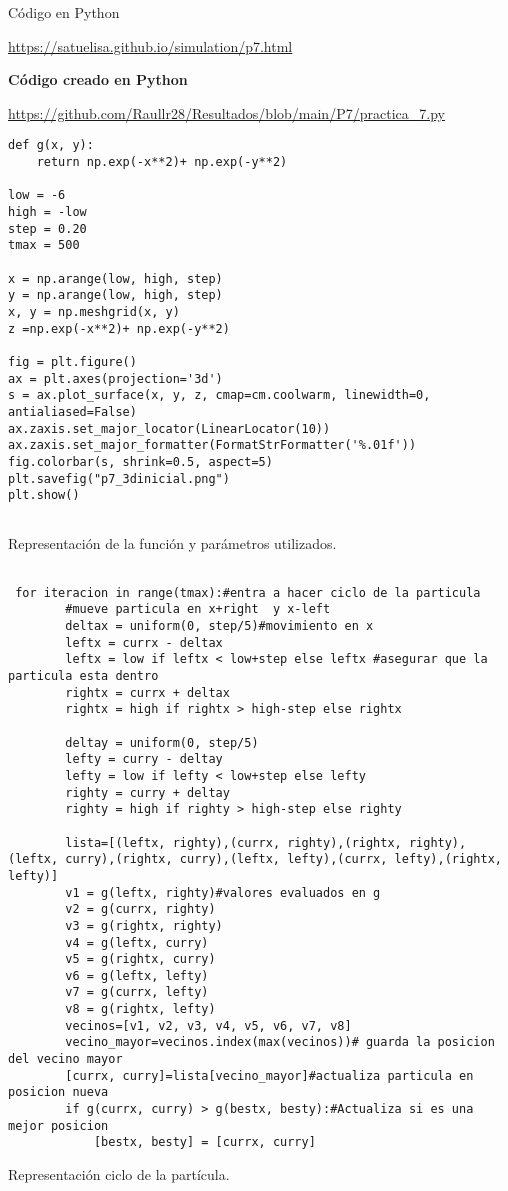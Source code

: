 \documentclass{article}
\begin{document}
 Código en Python 

\url{https://satuelisa.github.io/simulation/p7.html}

{\bf Código creado en Python}

\url{https://github.com/Raullr28/Resultados/blob/main/P7/practica_7.py}

\renewcommand{\listingscaption}{Código}

\begin{listing}[H]
\begin{verbatim}
def g(x, y):
    return np.exp(-x**2)+ np.exp(-y**2)

low = -6
high = -low
step = 0.20
tmax = 500

x = np.arange(low, high, step)
y = np.arange(low, high, step)
x, y = np.meshgrid(x, y)
z =np.exp(-x**2)+ np.exp(-y**2)

fig = plt.figure()
ax = plt.axes(projection='3d')
s = ax.plot_surface(x, y, z, cmap=cm.coolwarm, linewidth=0, antialiased=False)
ax.zaxis.set_major_locator(LinearLocator(10))
ax.zaxis.set_major_formatter(FormatStrFormatter('%.01f'))
fig.colorbar(s, shrink=0.5, aspect=5)
plt.savefig("p7_3dinicial.png")
plt.show()


  \end{verbatim}
  \label{lst:fibo}
  \caption{Representación de la función y parámetros utilizados.}
  
  
\end{listing}
\renewcommand{\listingscaption}{Código}
\begin{listing}[H]

\begin{verbatim}
 
 for iteracion in range(tmax):#entra a hacer ciclo de la particula
        #mueve particula en x+right  y x-left
        deltax = uniform(0, step/5)#movimiento en x 
        leftx = currx - deltax  
        leftx = low if leftx < low+step else leftx #asegurar que la particula esta dentro 
        rightx = currx + deltax 
        rightx = high if rightx > high-step else rightx
        
        deltay = uniform(0, step/5)
        lefty = curry - deltay  
        lefty = low if lefty < low+step else lefty  
        righty = curry + deltay  
        righty = high if righty > high-step else righty

        lista=[(leftx, righty),(currx, righty),(rightx, righty),(leftx, curry),(rightx, curry),(leftx, lefty),(currx, lefty),(rightx, lefty)]
        v1 = g(leftx, righty)#valores evaluados en g 
        v2 = g(currx, righty)
        v3 = g(rightx, righty)
        v4 = g(leftx, curry)
        v5 = g(rightx, curry)
        v6 = g(leftx, lefty)
        v7 = g(currx, lefty)
        v8 = g(rightx, lefty)
        vecinos=[v1, v2, v3, v4, v5, v6, v7, v8]
        vecino_mayor=vecinos.index(max(vecinos))# guarda la posicion del vecino mayor   
        [currx, curry]=lista[vecino_mayor]#actualiza particula en posicion nueva
        if g(currx, curry) > g(bestx, besty):#Actualiza si es una mejor posicion 
            [bestx, besty] = [currx, curry]
  \end{verbatim}
  \label{lst:fibo}
  \caption{Representación ciclo de la partícula.}
\end{listing}
\end{document}
